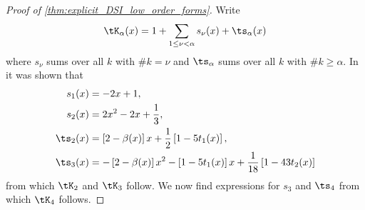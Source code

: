 \documentclass[acmsmall]{acmart}
\begin{document}
\begin{proof}[Proof of \cref{thm:explicit_DSI_low_order_forms}]
    Write  
    $$\tK_\alpha(x) = 1 + \sum_{1 \leq \nu < \alpha} s_\nu(x) + \ts_\alpha(x)$$ 
    where $s_\nu$ sums over all $k$ with $\#k = \nu$ and $\ts_\alpha$ sums over all $k$ with $\#k \geq \alpha$. In \citep[Corollary 1]{baldeaux.polylat_efficient_comp_worse_case_error_cbc} it was shown that 
    \begin{align*}
        s_1(x) &= -2x+1, \\
        s_2(x) &= 2x^2 - 2x + \frac{1}{3}, \\
        \ts_2(x) &=  \left[2-\beta(x)\right]x + \frac{1}{2}\left[1-5t_1(x)\right], \\
        \ts_3(x) &= -\left[2-\beta(x)\right] x^2 - \left[1-5t_1(x)\right]x + \frac{1}{18}\left[1-43t_2(x)\right]
    \end{align*}
    from which $\tK_2$ and $\tK_3$ follow. We now find expressions for $s_3$ and $\ts_4$ from which $\tK_4$ follows. 


\end{proof}
\end{document}
